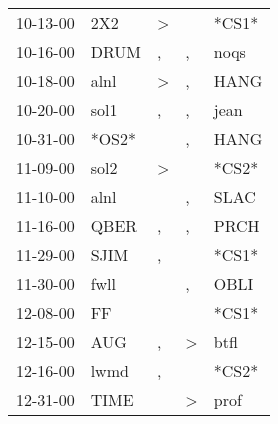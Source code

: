 \begin{supertabular}{p{0.07\textwidth}p{0.06\textwidth}p{0.02\textwidth}p{0.02\textwidth}p{0.06\textwidth}}
          10-13-00\textsuperscript{} &            2X2\textsuperscript{} &     \textgreater &                  &                            *CS1* \\
          10-16-00\textsuperscript{} &           DRUM\textsuperscript{} &                , &                , &           noqs\textsuperscript{} \\
          10-18-00\textsuperscript{} &           alnl\textsuperscript{} &     \textgreater &                , &           HANG\textsuperscript{} \\
          10-20-00\textsuperscript{} &           sol1\textsuperscript{} &                , &                , &           jean\textsuperscript{} \\
          10-31-00\textsuperscript{} &                            *OS2* &                  &                , &           HANG\textsuperscript{} \\
          11-09-00\textsuperscript{} &           sol2\textsuperscript{} &     \textgreater &                  &                            *CS2* \\
          11-10-00\textsuperscript{} &           alnl\textsuperscript{} &                  &                , &           SLAC\textsuperscript{} \\
          11-16-00\textsuperscript{} &           QBER\textsuperscript{} &                , &                , &           PRCH\textsuperscript{} \\
          11-29-00\textsuperscript{} &           SJIM\textsuperscript{} &                , &                  &                            *CS1* \\
          11-30-00\textsuperscript{} &           fwll\textsuperscript{} &                  &                , &           OBLI\textsuperscript{} \\
          12-08-00\textsuperscript{} &             FF\textsuperscript{} &                  &                  &                            *CS1* \\
          12-15-00\textsuperscript{} &            AUG\textsuperscript{} &                , &     \textgreater &           btfl\textsuperscript{} \\
          12-16-00\textsuperscript{} &           lwmd\textsuperscript{} &                , &                  &                            *CS2* \\
          12-31-00\textsuperscript{} &           TIME\textsuperscript{} &                  &     \textgreater &           prof\textsuperscript{} \\

\end{supertabular}

